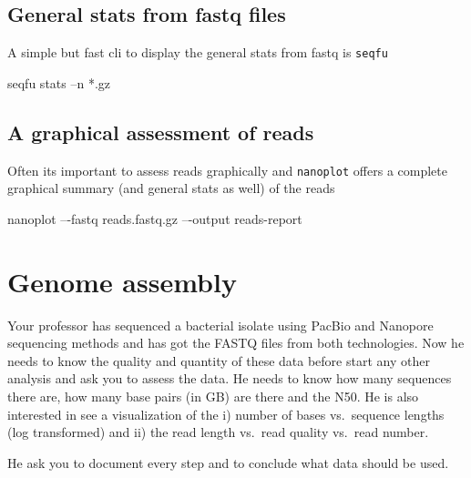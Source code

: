 \documentclass[
  letterpaper,
  DIV=11,
  numbers=noendperiod]{scrreprt}
\newenvironment{Shaded}{\begin{snugshade}}{\end{snugshade}}
\newcommand{\ExtensionTok}[1]{\textcolor[rgb]{0.00,0.46,0.62}{#1}}
\newcommand{\NormalTok}[1]{\textcolor[rgb]{0.00,0.46,0.62}{#1}}
\newcommand{\PreprocessorTok}[1]{\textcolor[rgb]{0.68,0.00,0.00}{#1}}
\begin{document}
\hypertarget{general-stats-from-fastq-files}{%
\section*{General stats from fastq
files}\label{general-stats-from-fastq-files}}

A simple but fast cli to display the general stats from fastq is
\texttt{seqfu}

\begin{Shaded}
\begin{Highlighting}[]
\ExtensionTok{seqfu}\NormalTok{ stats –n }\PreprocessorTok{*}\NormalTok{.gz}
\end{Highlighting}
\end{Shaded}

\hypertarget{a-graphical-assessment-of-reads}{%
\section*{A graphical assessment of
reads}\label{a-graphical-assessment-of-reads}}

Often its important to assess reads graphically and \texttt{nanoplot}
offers a complete graphical summary (and general stats as well) of the
reads

\begin{Shaded}
\begin{Highlighting}[]
\ExtensionTok{nanoplot}\NormalTok{ –{-}fastq reads.fastq.gz –{-}output reads{-}report}
\end{Highlighting}
\end{Shaded}

\hypertarget{genome-assembly}{%
\chapter{Genome assembly}\label{genome-assembly}}

\begin{tcolorbox}[standard jigsaw,toptitle=1mm, colback=white, opacitybacktitle=0.6, title=\textcolor{quarto-callout-warning-color}{\faExclamationTriangle}\hspace{0.5em}{Challenge}, toprule=.15mm, bottomtitle=1mm, colbacktitle=quarto-callout-warning-color!10!white, titlerule=0mm, arc=.35mm, colframe=quarto-callout-warning-color-frame, rightrule=.15mm, opacityback=0, bottomrule=.15mm, leftrule=.75mm, coltitle=black, left=2mm]
Your professor has sequenced a bacterial isolate using PacBio and
Nanopore sequencing methods and has got the FASTQ files from both
technologies. Now he needs to know the quality and quantity of these
data before start any other analysis and ask you to assess the data. He
needs to know how many sequences there are, how many base pairs (in GB)
are there and the N50. He is also interested in see a visualization of
the i) number of bases vs.~sequence lengths (log transformed) and ii)
the read length vs.~read quality vs.~read number.

He ask you to document every step and to conclude what data should be
used.
\end{tcolorbox}
\end{document}

